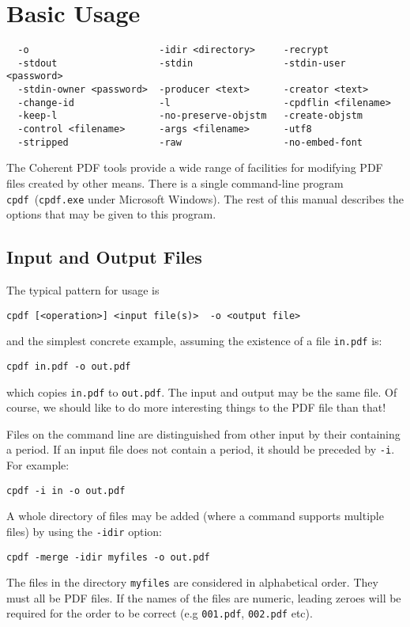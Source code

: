 \documentclass{book}
\newcommand{\cpdf}{\texttt{cpdf}}
\begin{document}
\chapter{Basic Usage}


\label{basicusage}
  \begin{framed}
  \small
  \noindent\begin{verbatim}
  -o                       -idir <directory>     -recrypt
  -stdout                  -stdin                -stdin-user <password>
  -stdin-owner <password>  -producer <text>      -creator <text>
  -change-id               -l                    -cpdflin <filename>
  -keep-l                  -no-preserve-objstm   -create-objstm
  -control <filename>      -args <filename>      -utf8
  -stripped                -raw                  -no-embed-font\end{verbatim}\end{framed}

  The Coherent PDF tools provide a wide range of facilities for modifying PDF
files created by other means. There is a single command-line program
\cpdf\ (\texttt{cpdf.exe} under Microsoft Windows). The rest of this manual describes the options that may be given
to this program.


   
  \section{Input and Output Files}
  The typical pattern for usage is
  \begin{framed}
  \small\verb!cpdf [<operation>] <input file(s)>  -o <output file>!
  \end{framed}
  \noindent and the simplest concrete example, assuming the existence of a file
\texttt{in.pdf} is:
  \begin{framed}
  \small\verb!cpdf in.pdf -o out.pdf!
  \end{framed}
  \noindent which copies \texttt{in.pdf} to \texttt{out.pdf}. The input and
output may be the same file. Of course, we should like to do more interesting
things to the PDF file than that!

  Files on the command line are distinguished from other input by their
containing a period. If an input file does not contain a period, it should be
preceded by \verb!-i!. For example:

  \begin{framed}
  \small\verb!cpdf -i in -o out.pdf!
  \end{framed}
\noindent A whole directory of files may be added (where a command supports multiple files) by using the \verb!-idir! option:
  \begin{framed}
  \small\verb!cpdf -merge -idir myfiles -o out.pdf!
  \end{framed}
  \noindent The files in the directory \verb!myfiles! are considered in alphabetical order. They must all be PDF files. If the names of the files are numeric, leading zeroes will be required for the order to be correct (e.g \verb!001.pdf!, \verb!002.pdf! etc).
\end{document}
